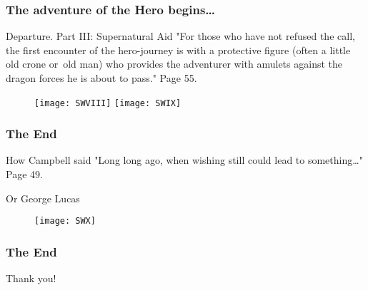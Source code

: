 \documentclass{beamer}  %
\begin{document}
\begin{frame}
  \frametitle{The adventure of the Hero begins\ldots}

  \begin{block}{Departure. Part III: Supernatural Aid}
    "For those who have not refused the call, the first encounter of
    the hero-journey is with a protective figure (often a little old
    crone or~old man) who provides the adventurer with amulets against
    the dragon forces he is about to pass." Page 55.
  \end{block}

  \begin{block}{}
    \begin{figure}
      \centering

      \texttt{[image: SWVIII]}
      \texttt{[image: SWIX]}
    \end{figure}
  \end{block}

\end{frame}



\begin{frame}
  \frametitle{The End}

\begin{block}{How Campbell said}
  "Long long ago, when wishing still could lead to something\ldots"
  Page 49.
\end{block}

\begin{block}{Or George Lucas}
  \begin{figure}
    \centering

    \texttt{[image: SWX]}
  \end{figure}
\end{block}

\end{frame}



\begin{frame}
  \frametitle{The End}
  \begin{center}
    \LARGE{Thank you!}
  \end{center}

\end{frame}
\end{document}
